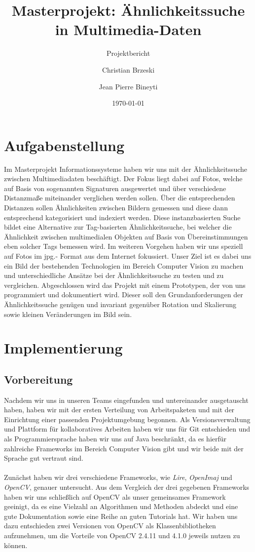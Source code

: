 \documentclass{scrartcl}
\title{Masterprojekt: Ähnlichkeitssuche in Multimedia-Daten}
\subtitle{Projektbericht}
\author{Christian Brzeski \and Jean Pierre Bineyti}
\date{\today}
\begin{document}
\maketitle

\section{Aufgabenstellung}
Im Masterprojekt Informationssysteme haben wir uns mit der Ähnlichkeitssuche zwischen Multimediadaten beschäftigt. Der Fokus liegt dabei auf Fotos, welche auf Basis von sogenannten Signaturen ausgewertet und über verschiedene Distanzmaße miteinander verglichen werden sollen. Über die entsprechenden Distanzen sollen Ähnlichkeiten zwischen Bildern gemessen und  diese dann entsprechend kategorisiert und indexiert werden. Diese instanzbasierten Suche bildet eine Alternative zur Tag-basierten Ähnlichkeitssuche, bei welcher die Ähnlichkeit zwischen multimedialen Objekten auf Basis von Übereinstimmungen eben solcher Tags bemessen wird. Im weiteren Vorgehen haben wir uns speziell auf Fotos im jpg.- Format aus dem Internet fokussiert. Unser Ziel ist es dabei uns ein Bild der bestehenden Technologien im Bereich Computer Vision zu machen und unterschiedliche Ansätze bei der Ähnlichkeitssuche zu testen und zu vergleichen. Abgeschlossen wird das Projekt mit einem Prototypen, der von uns programmiert und dokumentiert wird. Dieser soll den Grundanforderungen der Ähnlichkeitssuche genügen und invariant gegenüber Rotation und Skalierung sowie kleinen Veränderungen im Bild sein.

\section{Implementierung}

\subsection{Vorbereitung}

Nachdem wir uns in unseren Teams eingefunden und untereinander ausgetauscht haben, haben wir mit der ersten Verteilung von Arbeitspaketen und mit der Einrichtung einer passenden Projektumgebung begonnen. Als Versionsverwaltung und Plattform für kollaboratives Arbeiten haben wir uns für Git entschieden und als Programmiersprache haben wir uns auf Java beschränkt, da es hierfür zahlreiche Frameworks im Bereich Computer Vision gibt und wir beide mit der Sprache gut vertraut sind. 
\\
\\
Zunächst haben wir drei verschiedene Frameworks, wie \textit{Lire}, \textit{OpenImaj} und \textit{OpenCV}, genauer untersucht. Aus dem Vergleich der drei gegebenen Frameworks haben wir uns schließlich auf OpenCV als unser gemeinsames Framework geeinigt, da es eine Vielzahl an Algorithmen und Methoden abdeckt und eine gute Dokumentation sowie eine Reihe an guten Tutorials hat. Wir haben uns dazu entschieden zwei Versionen von OpenCV als Klassenbibliotheken aufzunehmen, um die Vorteile von OpenCV 2.4.11 und 4.1.0 jeweils nutzen zu können.
\end{document}
